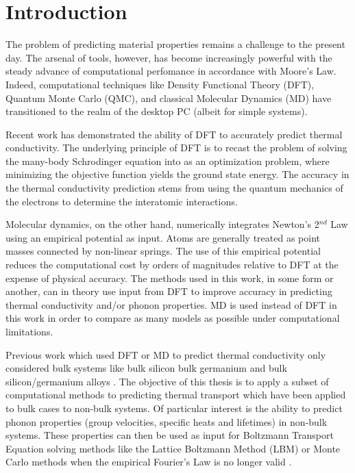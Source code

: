 \chapter{Introduction}
The problem of predicting material properties remains a challenge to the present day. The arsenal of tools, however, has become increasingly powerful with the steady advance of computational perfomance in accordance with Moore's Law. Indeed, computational techniques like Density Functional Theory (DFT), Quantum Monte Carlo (QMC), and classical Molecular Dynamics (MD) have transitioned to the realm of the desktop PC (albeit for simple systems).

Recent work has demonstrated the ability of DFT \cite{broido1,PhysRevB.84.085204} to accurately predict thermal conductivity. The underlying principle of DFT is to recast the problem of solving the many-body Schrodinger equation into as an optimization problem, where minimizing the objective function yields the ground state energy. The accuracy in the thermal conductivity prediction stems from using the quantum mechanics of the electrons to determine the interatomic interactions.

Molecular dynamics, on the other hand, numerically integrates Newton's 2$^{nd}$ Law using an empirical potential as input. Atoms are generally treated as point masses connected by non-linear springs. The use of this empirical potential reduces the computational cost by orders of magnitudes relative to DFT at the expense of physical accuracy. The methods used in this work, in some form or another, can in theory use input from DFT to improve accuracy in predicting thermal conductivity and/or phonon properties. MD is used instead of DFT in this work in order to compare as many models as possible under computational limitations.

Previous work which used DFT or MD to predict thermal conductivity only considered bulk systems like bulk silicon \cite{PhysRevB.84.085204} bulk germanium \cite{broido2007intrinsic} and bulk silicon/germanium alloys \cite{garg2011role}. The objective of this thesis is to apply a subset of computational methods to predicting thermal transport which have been applied to bulk cases to non-bulk systems. Of particular interest is the ability to predict phonon properties (group velocities, specific heats and lifetimes) in non-bulk systems. These properties can then be used as input for Boltzmann Transport Equation solving methods like the Lattice Boltzmann Method (LBM) \cite{escobar2006multi,smith2006lattice,nabovati2011lattice} or Monte Carlo methods \cite{mazumder2001monte, lacroix2005monte, peraud2011efficient} when the empirical Fourier's Law is no longer valid \cite{cahill2003nanoscale}. %

